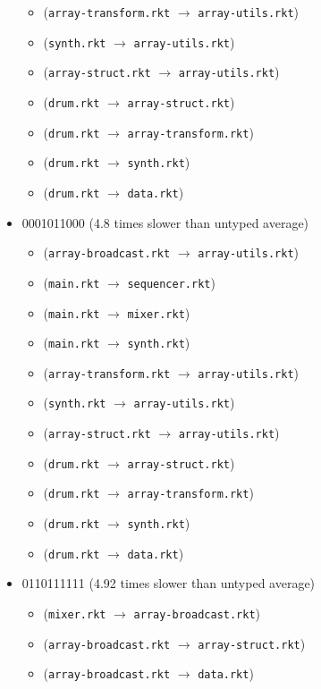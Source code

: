 \documentclass{article}
\newcommand{\mono}[1]{\texttt{#1}}
\begin{document}
\begin{itemize}
\begin{itemize}
  \item (\mono{array-transform.rkt} $\rightarrow$ \mono{array-utils.rkt})
  \item (\mono{synth.rkt} $\rightarrow$ \mono{array-utils.rkt})
  \item (\mono{array-struct.rkt} $\rightarrow$ \mono{array-utils.rkt})
  \item (\mono{drum.rkt} $\rightarrow$ \mono{array-struct.rkt})
  \item (\mono{drum.rkt} $\rightarrow$ \mono{array-transform.rkt})
  \item (\mono{drum.rkt} $\rightarrow$ \mono{synth.rkt})
  \item (\mono{drum.rkt} $\rightarrow$ \mono{data.rkt})
  \end{itemize}
\item 0001011000 (4.8 times slower than untyped average)
  \begin{itemize}
  \item (\mono{array-broadcast.rkt} $\rightarrow$ \mono{array-utils.rkt})
  \item (\mono{main.rkt} $\rightarrow$ \mono{sequencer.rkt})
  \item (\mono{main.rkt} $\rightarrow$ \mono{mixer.rkt})
  \item (\mono{main.rkt} $\rightarrow$ \mono{synth.rkt})
  \item (\mono{array-transform.rkt} $\rightarrow$ \mono{array-utils.rkt})
  \item (\mono{synth.rkt} $\rightarrow$ \mono{array-utils.rkt})
  \item (\mono{array-struct.rkt} $\rightarrow$ \mono{array-utils.rkt})
  \item (\mono{drum.rkt} $\rightarrow$ \mono{array-struct.rkt})
  \item (\mono{drum.rkt} $\rightarrow$ \mono{array-transform.rkt})
  \item (\mono{drum.rkt} $\rightarrow$ \mono{synth.rkt})
  \item (\mono{drum.rkt} $\rightarrow$ \mono{data.rkt})
  \end{itemize}
\item 0110111111 (4.92 times slower than untyped average)
  \begin{itemize}
  \item (\mono{mixer.rkt} $\rightarrow$ \mono{array-broadcast.rkt})
  \item (\mono{array-broadcast.rkt} $\rightarrow$ \mono{array-struct.rkt})
  \item (\mono{array-broadcast.rkt} $\rightarrow$ \mono{data.rkt})

\end{itemize}
\end{itemize}
\end{document}
